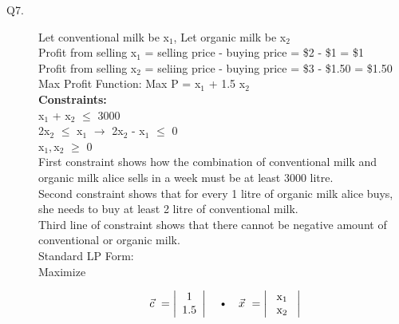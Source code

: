 \documentclass[10pt]{csc_assignment}
\begin{document}
\begin{description}


\newpage
\item[Q7.]

Let conventional milk be  x$_{1}$, Let organic milk be  x$_{2}$\\
Profit from selling  x$_{1}$ = selling price - buying price = \$2 - \$1 = \$1\\
Profit from selling  x$_{2}$ = seliing price - buying price = \$3 - \$1.50 = \$1.50\\
Max Profit Function: Max P =  x$_{1}$ + 1.5 x$_{2}$\\

\textbf{Constraints:}\\
x$_{1}$ +  x$_{2}$  $\leqslant$ 3000\\
2x$_{2}$  $\leqslant$ x$_{1}$    $\rightarrow$     2x$_{2}$ - x$_{1}$  $\leqslant$ 0\\
x$_{1}, $x$_{2}$ $\geqslant$ 0\\

First constraint shows how the combination of conventional milk and organic milk alice sells in a week must be at least 3000 litre.\\
Second constraint shows that for every 1 litre of organic milk alice buys, she needs to buy at least 2 litre of conventional milk. \\
Third line of constraint shows that there cannot be negative amount of conventional or organic milk.\\

Standard LP Form:\\
Maximize

\[ \text{ $\vec{c}$ }= \left| \begin{array}{c}
1 \\
1.5 \end{array} \right| 
\text{~~~\textbullet ~~~} \text{$\vec{x}$ } = \left| \begin{array}{c}
\text{ x$_{1}$ } \\
\text{ x$_{2}$ } \end{array} \right| \] 


\end{description}
\end{document}
